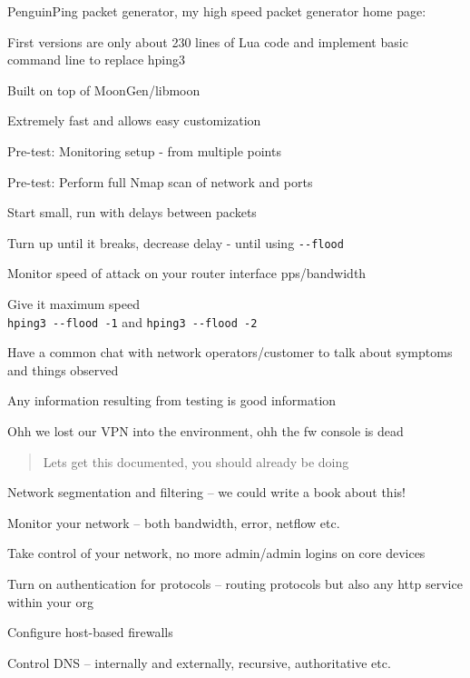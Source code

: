 \documentclass[Screen16to9,17pt]{foils}
\begin{document}


\begin{list2}
\item PenguinPing packet generator, my high speed packet generator
home page: 
\item First versions are only about 230 lines of Lua code and implement basic command line to replace hping3
\item Built on top of MoonGen/libmoon 
\end{list2}

\centerline{Extremely fast and allows easy customization}



\begin{list2}
\item Pre-test: Monitoring setup - from multiple points
\item Pre-test: Perform full Nmap scan of network and ports
\item Start small, run with delays between packets
\item Turn up until it breaks, decrease delay - until using \verb+--flood+
\item Monitor speed of attack on your router interface pps/bandwidth
\item Give it maximum speed\\
 \verb+hping3 --flood -1+ and \verb+hping3 --flood -2+
\item Have a common chat with network operators/customer to talk about symptoms and things observed
\item Any information resulting from testing is good information
\end{list2}

\vskip 1cm
\centerline{Ohh we lost our VPN into the environment, ohh the fw console is dead}




\begin{quote}
Lets get this documented, you should already be doing
\end{quote}

\begin{list2}
\item Network segmentation and filtering -- we could write a book about this! {\myalert}
\item Monitor your network -- both bandwidth, error, netflow etc. {\myalert}
\item Take control of your network, no more admin/admin logins on core devices {\myalert}
\item Turn on authentication for protocols -- routing protocols but also any http service within your org {\myalert}
\item Configure host-based firewalls {\myalert}
\item Control DNS -- internally and externally, recursive, authoritative etc. {\myalert}
\end{list2}
\end{document}
